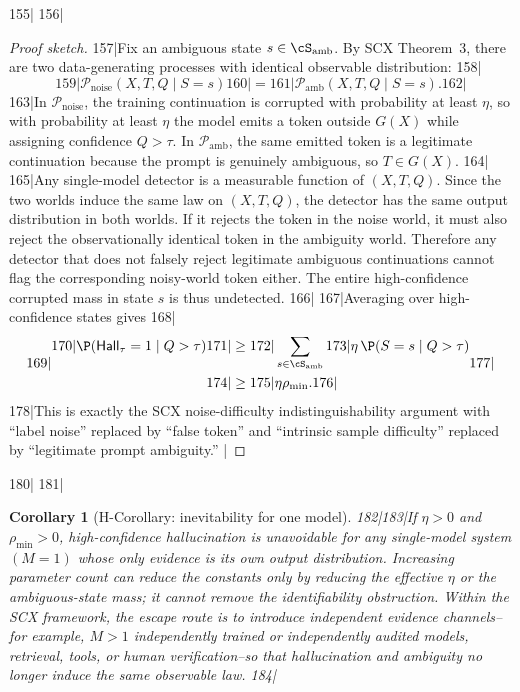 \documentclass[11pt,a4paper]{article}
\newtheorem{corollary}[theorem]{Corollary}
\theoremstyle{definition}
\theoremstyle{remark}
\begin{document}
155|
156|\begin{proof}[Proof sketch]
157|Fix an ambiguous state $s \in \cS_{\mathrm{amb}}$. By SCX Theorem~3, there are two data-generating processes with identical observable distribution:
158|\[
159|\mathcal{P}_{\mathrm{noise}}(X,T,Q \mid S=s)
160|=
161|\mathcal{P}_{\mathrm{amb}}(X,T,Q \mid S=s).
162|\]
163|In $\mathcal{P}_{\mathrm{noise}}$, the training continuation is corrupted with probability at least $\eta$, so with probability at least $\eta$ the model emits a token outside $G(X)$ while assigning confidence $Q>\tau$. In $\mathcal{P}_{\mathrm{amb}}$, the same emitted token is a legitimate continuation because the prompt is genuinely ambiguous, so $T\in G(X)$.
164|
165|Any single-model detector is a measurable function of $(X,T,Q)$. Since the two worlds induce the same law on $(X,T,Q)$, the detector has the same output distribution in both worlds. If it rejects the token in the noise world, it must also reject the observationally identical token in the ambiguity world. Therefore any detector that does not falsely reject legitimate ambiguous continuations cannot flag the corresponding noisy-world token either. The entire high-confidence corrupted mass in state $s$ is thus undetected.
166|
167|Averaging over high-confidence states gives
168|\[
169|\begin{aligned}
170|\P(\mathsf{Hall}_\tau=1 \mid Q>\tau)
171|&\geq
172|\sum_{s\in\cS_{\mathrm{amb}}}
173|\eta\,\P(S=s\mid Q>\tau)\\
174|&\geq
175|\eta \rho_{\min}.
176|\end{aligned}
177|\]
178|This is exactly the SCX noise-difficulty indistinguishability argument with ``label noise'' replaced by ``false token'' and ``intrinsic sample difficulty'' replaced by ``legitimate prompt ambiguity.'' |\end{proof}
180|
181|\begin{corollary}[H-Corollary: inevitability for one model]
182|\label{cor:h_inevitability}
183|If $\eta>0$ and $\rho_{\min}>0$, high-confidence hallucination is unavoidable for any single-model system $(M=1)$ whose only evidence is its own output distribution. Increasing parameter count can reduce the constants only by reducing the effective $\eta$ or the ambiguous-state mass; it cannot remove the identifiability obstruction. Within the SCX framework, the escape route is to introduce independent evidence channels--for example, $M>1$ independently trained or independently audited models, retrieval, tools, or human verification--so that hallucination and ambiguity no longer induce the same observable law.
184|\end{corollary}
\end{document}
